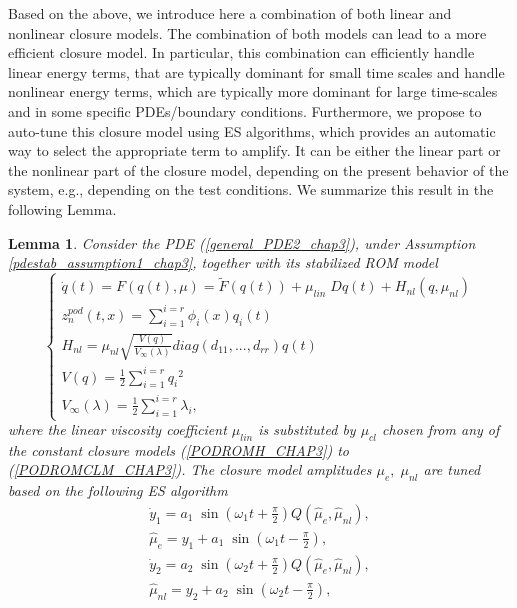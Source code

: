 \documentclass[letterpaper,conference,onecolumn,11pt]{IEEEtran}
\newtheorem{lemma}{Lemma}
\begin{document}
Based on the above, we introduce here a combination of both linear and
nonlinear closure models. The combination of both models can lead to a
more efficient closure model. In particular, this combination can
efficiently handle linear energy terms, that are typically dominant
for small time scales and handle nonlinear energy terms, which are
typically more dominant for large time-scales and in some specific
PDEs/boundary conditions. Furthermore, we propose to auto-tune this
closure model using ES algorithms, which provides an automatic way to
select the appropriate term to amplify. It can be either the linear
part or the nonlinear part of the closure model, depending on the
present behavior of the system, e.g., depending on the test
conditions.  We summarize this result in the following Lemma.


\begin{lemma}\label{pdestab_lemma2_chap3}
Consider the PDE (\ref{general_PDE2_chap3}), under Assumption
\ref{pdestab_assumption1_chap3}, together with its stabilized ROM
model
\begin{equation}\label{pdestab_romnl1_CHAP3}
\left\{\begin{array}{l}
\dot{q}(t) =F(q(t),\mu)=\tilde{F}(q(t))+\mu_{lin}\;Dq(t)+H_{nl}(q,\mu_{nl})\\
z_n^{pod}(t,x)=\sum_{i=1}^{i=r}\phi_{i}(x)q_{i}(t)\\
H_{nl}=\mu_{nl}\sqrt{\frac{V(q)}{V_{\infty}(\lambda)}}diag(d_{11},...,d_{rr})q(t)\\
V(q)=\frac{1}{2}\sum_{i=1}^{i=r}{q_{i}}^{2}\\
V_{\infty}(\lambda)=\frac{1}{2}\sum_{i=1}^{i=r}\lambda_{i},
\end{array}\right.
\end{equation}
 where the linear viscosity coefficient
$\mu_{lin}$ is substituted by $\mu_{cl}$ chosen from any of the
constant closure models (\ref{PODROMH_CHAP3}) to
(\ref{PODROMCLM_CHAP3}). The closure model amplitudes
$\mu_{e},\;\mu_{nl}$ are tuned based on the following ES algorithm
\begin{equation}
\begin{array}{l}
\dot{y}_{1}=a_{1}\;\sin(\omega_{1} t+\frac{\pi}{2})Q(\hat\mu_{e},{\hat\mu}_{nl}),\\
\hat{\mu}_{e}=y_{1}+a_{1}\;\sin(\omega_{1} t-\frac{\pi}{2}),\\
\dot{y}_{2}=a_{2}\;\sin(\omega_{2} t+\frac{\pi}{2})Q(\hat\mu_{e},{\hat\mu}_{nl}),\\
\hat{\mu}_{nl}=y_{2}+a_{2}\;\sin(\omega_{2} t-\frac{\pi}{2}),

\end{array}
\end{equation}
\end{lemma}
\end{document}
